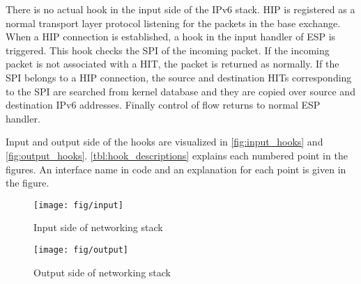 There is no actual hook in the input side of the IPv6 stack. HIP is
registered as a normal transport layer protocol listening for the
packets in the base exchange. When a HIP connection is established, a
hook in the input handler of ESP is triggered. This hook checks the
SPI of the incoming packet. If the incoming packet is not associated
with a HIT, the packet is returned as normally. If the SPI belongs to
a HIP connection, the source and destination HITs corresponding to the
SPI are searched from kernel database and they are copied over source
and destination IPv6 addresses. Finally control of flow returns to
normal ESP handler.

Input and output side of the hooks are visualized in
\autoref{fig:input_hooks} and \autoref{fig:output_hooks}.
\autoref{tbl:hook_descriptions} explains each numbered point in the
figures. An interface name in code and an explanation for each point
is given in the figure.

\begin{figure}
   \begin{minipage}[b]{0.4\textwidth}
      \centering
      \texttt{[image: fig/input]}
      \caption{Input side of networking stack}
      \label{fig:input_hooks}
   \end{minipage}%
   \hfill%
   \begin{minipage}[b]{0.9\textwidth}
      \centering
      \centering
      \texttt{[image: fig/output]}
      \caption{Output side of networking stack}
      \label{fig:output_hooks}
   \end{minipage}%
\end{figure}

